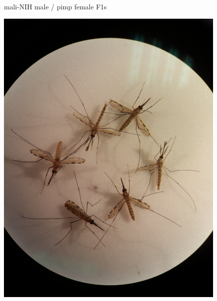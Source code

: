 \documentclass{article}
\begin{document}
\begin{figure}[p]

mali-NIH male / pimp female F1s

\includegraphics[scale=0.05]{mali-NIH-♂_pimp-♀}
\end{figure}
\end{document}
